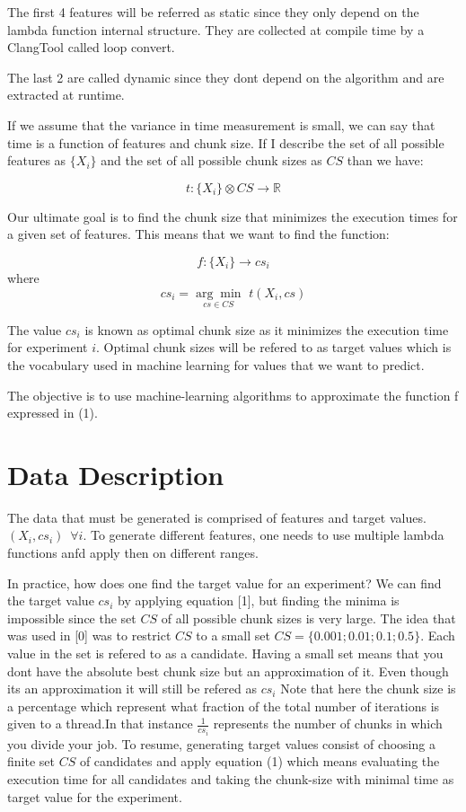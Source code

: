 \documentclass[12pt]{article}
\begin{document}
The first 4 features will be referred as static since they only depend on the lambda function internal structure. They are collected at compile time by a ClangTool called loop convert.

The last 2 are called dynamic since they dont depend on the algorithm and are extracted at runtime.

If we assume that the variance in time measurement is small, we can say that time is a function of features and chunk size. If I describe the set of all possible features as $\{X_i\}$ and the set of all possible chunk sizes as $CS$ than we have:

$$t:\{X_i\} \otimes CS \rightarrow \mathbb{R}$$

Our ultimate goal is to find the chunk size that minimizes the execution times for a given set of features. This means that we want to find the function:

\begin{equation}
	f:\{X_i\}\rightarrow cs_i
\end{equation}
 where
\begin{equation}
 cs_i=\underset{cs \in CS}{\arg\min} \, \, t(X_i,cs)
\end{equation}

The  value $cs_i$ is known as optimal chunk size as it minimizes the execution time for experiment $i$. Optimal chunk sizes will be refered to as target values which is the vocabulary used in machine learning for values that we want to predict.

The objective is to use machine-learning algorithms to approximate the function f expressed in (1).

\section{Data Description}
The data that must be generated is comprised of features and target values. $(X_i,cs_i) \, \, \, \forall i$. To generate different features, one needs to use multiple lambda functions anfd apply then on different ranges.

In practice, how does one find the target value for an experiment? We can find the target value $cs_i$ by applying equation [1], but finding the minima is impossible since the set $CS$ of all possible chunk sizes is very large. The idea that was used in [0] was to restrict $CS$ to a small set
$CS=\{0.001;0.01;0.1;0.5\}$. Each value in the set is refered to as a candidate. Having a small set means that you dont have the absolute best chunk size but an approximation of it. Even though its an approximation it will still be refered as $cs_i$
Note that here the chunk size is a percentage which represent what fraction of the total number of iterations is given to a thread.In that instance $\frac{1}{cs_i}$ represents the number of chunks in which you divide your job. To resume, generating target values consist of choosing a finite set $CS$ of candidates and apply equation (1) which means evaluating the execution time for all candidates and taking the chunk-size with minimal time as target value for the experiment.
\end{document}
